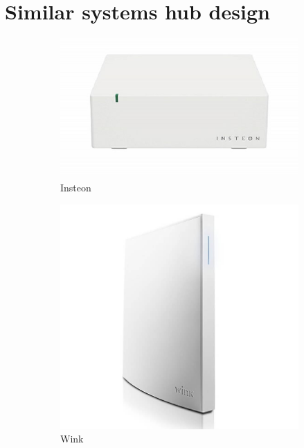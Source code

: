 \documentclass[12pt, oneside, a4paper]{book}
\begin{document}
		\section{Similar systems hub design}
		\begin{figure}[H]
			\begin{subfigure}[b]{.5\linewidth}
				\includegraphics[width=\linewidth]{img/insteon_hw.png}
				\caption{Insteon}
			\end{subfigure}
			\begin{subfigure}[b]{.5\linewidth}
				\includegraphics[width=\linewidth]{img/wink_hw.png}
				\caption{Wink}
			\end{subfigure}
			\begin{subfigure}[b]{.5\linewidth}

\end{subfigure}
\end{figure}
\end{document}
